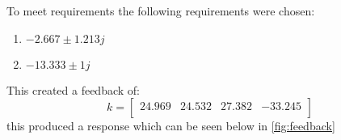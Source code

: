 To meet requirements the following requirements were chosen: \begin{enumerate}
\item$-2.667 \pm 1.213j$\\
\item$-13.333 \pm 1j$\end{enumerate}
This created a feedback of: 
\begin{equation}k = \begin{bmatrix}
24.969&24.532&27.382&-33.245\\
\end{bmatrix}
\end{equation}this produced a response which can be seen below in \autoref{fig:feedback}
